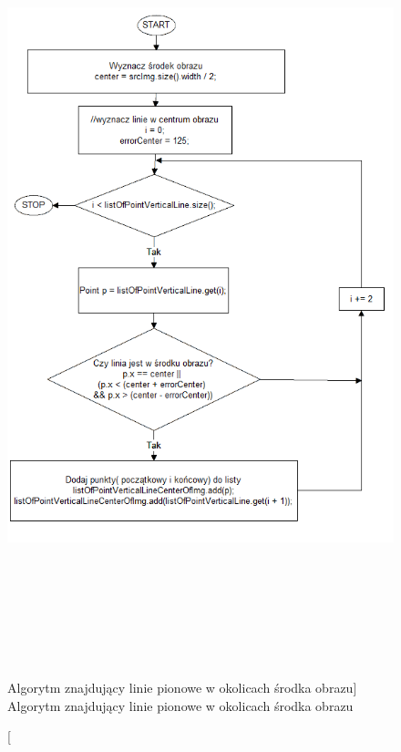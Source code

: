 \documentclass[a4paper,12pt]{article}
\begin{document}
    	        \begin{figure}[!ht]  
    			    \begin{center}
    				    \includegraphics[height=22.5cm ]{image//algorithm//divideToPagePred_02.png} 
    			    \end{center}
    			    \caption
        			[Algorytm znajdujący linie pionowe w okolicach środka obrazu]  
        			{Algorytm znajdujący linie pionowe w okolicach środka obrazu}  
    		    \end{figure}
		
		        \newpage
		
\end{document}
